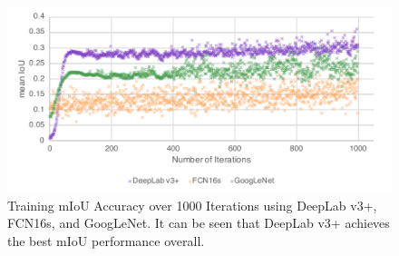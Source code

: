 \begin{figure}
	\centering
	\includegraphics[width=\textwidth]{figures/experiments/network-comparison.pdf}
		\caption[Network Comparison Chart]{Training mIoU Accuracy over 1000 Iterations using DeepLab v3+, FCN16s, and GoogLeNet. It can be seen that DeepLab v3+ achieves the best mIoU performance overall.}
		\label{chart:experiments-networkcomparison}
\end{figure}